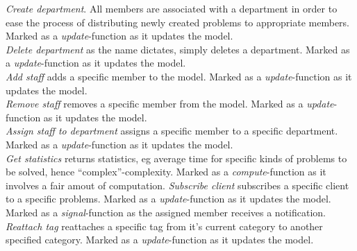 \emph{Create department}. All \astaff[] members are associated with a department in order to ease the process of distributing newly created problems to appropriate \astaff[] members. Marked as a \textit{update}-function as it updates the model. \\

\emph{Delete department} as the name dictates, simply deletes a department. Marked as a \textit{update}-function as it updates the model. \\

\emph{Add staff} adds a specific \astaff[] member to the model. Marked as a \textit{update}-function as it updates the model. \\

\emph{Remove staff} removes a specific \astaff[] member from the model. Marked as a \textit{update}-function as it updates the model. \\

\emph{Assign staff to department} assigns a specific \astaff[] member to a specific department. Marked as a \textit{update}-function as it updates the model. \\

\emph{Get statistics} returns statistics, eg average time for specific kinds of problems to be solved, hence ``complex''-complexity. Marked as a \textit{compute}-function as it involves a fair amout of computation.
\emph{Subscribe client} subscribes a specific client to a specific problems. Marked as a \textit{update}-function as it updates the model. Marked as a \textit{signal}-function as the assigned \astaff[] member receives a notification. \\

\emph{Reattach tag} reattaches a specific tag from it's current category to another specified category. Marked as a \textit{update}-function as it updates the model.